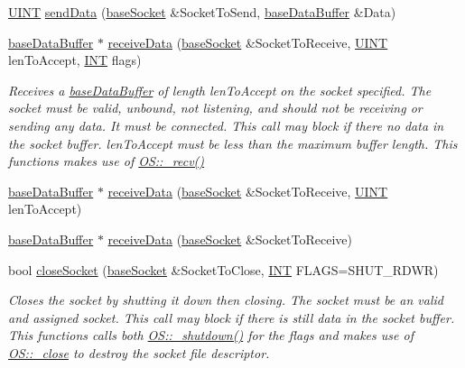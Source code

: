 \begin{DoxyCompactItemize}
\hyperlink{typedefs_8h_a2e2c38961834f28c06e17e074eb00bc7}{U\+I\+N\+T} \hyperlink{class_communication_1_1base_gateway_a03d1953b62ffee1f5dfa0ad3f579c2e5}{send\+Data} (\hyperlink{class_communication_1_1base_socket}{base\+Socket} \&Socket\+To\+Send, \hyperlink{class_communication_1_1base_data_buffer}{base\+Data\+Buffer} \&Data)
\item 
\hyperlink{class_communication_1_1base_data_buffer}{base\+Data\+Buffer} $\ast$ \hyperlink{class_communication_1_1base_gateway_adcdbbefcddb590bf3d2d7b616a915d24}{receive\+Data} (\hyperlink{class_communication_1_1base_socket}{base\+Socket} \&Socket\+To\+Receive, \hyperlink{typedefs_8h_a2e2c38961834f28c06e17e074eb00bc7}{U\+I\+N\+T} len\+To\+Accept, \hyperlink{typedefs_8h_a0240b856f74f8905ed334a5a0ca624e5}{I\+N\+T} flags)
\begin{DoxyCompactList}\small\item\em Receives a \hyperlink{class_communication_1_1base_data_buffer}{base\+Data\+Buffer} of length len\+To\+Accept on the socket specified. The socket must be valid, unbound, not listening, and should not be receiving or sending any data. It must be connected. This call may block if there no data in the socket buffer. len\+To\+Accept must be less than the maximum buffer length. This functions makes use of \hyperlink{class_communication_1_1_o_s_a1eaa3e210f77c5b06bc818723595a0e4}{O\+S\+::\+\_\+recv()} \end{DoxyCompactList}\item 
\hyperlink{class_communication_1_1base_data_buffer}{base\+Data\+Buffer} $\ast$ \hyperlink{class_communication_1_1base_gateway_ac6d9f425318417faf8da620184f413b7}{receive\+Data} (\hyperlink{class_communication_1_1base_socket}{base\+Socket} \&Socket\+To\+Receive, \hyperlink{typedefs_8h_a2e2c38961834f28c06e17e074eb00bc7}{U\+I\+N\+T} len\+To\+Accept)
\item 
\hyperlink{class_communication_1_1base_data_buffer}{base\+Data\+Buffer} $\ast$ \hyperlink{class_communication_1_1base_gateway_aa15590c94dccb975fc2f5394b4a0ac5f}{receive\+Data} (\hyperlink{class_communication_1_1base_socket}{base\+Socket} \&Socket\+To\+Receive)
\item 
bool \hyperlink{class_communication_1_1base_gateway_a6d0f24de107a1e43bd2a41fe2ba421ba}{close\+Socket} (\hyperlink{class_communication_1_1base_socket}{base\+Socket} \&Socket\+To\+Close, \hyperlink{typedefs_8h_a0240b856f74f8905ed334a5a0ca624e5}{I\+N\+T} F\+L\+A\+G\+S=S\+H\+U\+T\+\_\+\+R\+D\+W\+R)
\begin{DoxyCompactList}\small\item\em Closes the socket by shutting it down then closing. The socket must be an valid and assigned socket. This call may block if there is still data in the socket buffer. This functions calls both \hyperlink{class_communication_1_1_o_s_a48497a56e399c71521402474881c1a91}{O\+S\+::\+\_\+shutdown()} for the flags and makes use of \hyperlink{class_communication_1_1_o_s_a61e6b800ca7347f20a8326e7d7666b46}{O\+S\+::\+\_\+close} to destroy the socket file descriptor. \end{DoxyCompactList}\end{DoxyCompactItemize}



